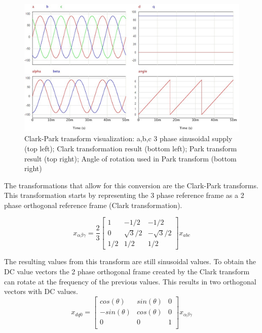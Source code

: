 \begin{figure}[h]
    \centering
    \includegraphics[scale = 0.5]{Figures/ClarkPark.jpg}
    \caption{Clark-Park transform visualization: a,b,c 3 phase sinusoidal supply (top left); Clark transformation result (bottom left); Park transform result (top right); Angle of rotation used in Park transform (bottom right)}
    \label{fig:albet-dq0}
\end{figure}

The transformations that allow for this conversion are the Clark-Park transforms. This transformation starts by representing the 3 phase reference frame as a 2 phase orthogonal reference frame (Clark transformation).

\begin{equation}
    x_{\alpha \beta \gamma} = \frac{2}{3}\begin{bmatrix}
1 & -1/2 & -1/2 \\
0 & \sqrt{3}/2 & -\sqrt{3}/2 \\
1/2 & 1/2 & 1/2
\end{bmatrix}x_{abc}
\end{equation}

The resulting values from this transform are still sinusoidal values. To obtain the DC value vectors the 2 phase orthogonal frame created by the Clark transform can rotate at the frequency of the previous values. This results in two orthogonal vectors with DC values.
\begin{equation}
    x_{dq0} = \begin{bmatrix}
    cos(\theta) & sin(\theta) & 0 \\
    -sin(\theta) & cos(\theta) & 0\\
    0 & 0 & 1 \\
    \end{bmatrix}x_{\alpha\beta\gamma}
\end{equation}

